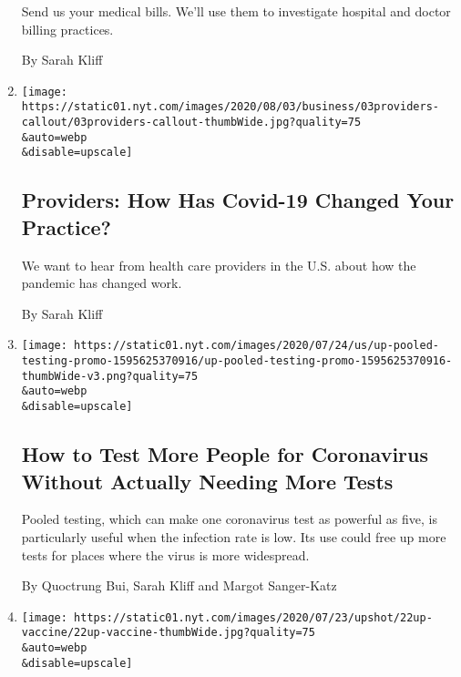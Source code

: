 \begin{enumerate}
  Send us your medical bills. We'll use them to investigate hospital and
  doctor billing practices.

  By Sarah Kliff
\item
  \href{/2020/08/03/reader-center/healthcare-workers-coronavirus-care.html}{}

  \texttt{[image: https://static01.nyt.com/images/2020/08/03/business/03providers-callout/03providers-callout-thumbWide.jpg?quality=75\\\&auto=webp\\\&disable=upscale]}

  \hypertarget{providers-how-has-covid-19-changed-your-practice}{%
  \subsection{Providers: How Has Covid-19 Changed Your
  Practice?}\label{providers-how-has-covid-19-changed-your-practice}}

  We want to hear from health care providers in the U.S. about how the
  pandemic has changed work.

  By Sarah Kliff
\item
  \href{/interactive/2020/07/27/upshot/coronavirus-pooled-testing.html}{}

  \texttt{[image: https://static01.nyt.com/images/2020/07/24/us/up-pooled-testing-promo-1595625370916/up-pooled-testing-promo-1595625370916-thumbWide-v3.png?quality=75\\\&auto=webp\\\&disable=upscale]}

  \hypertarget{how-to-test-more-people-for-coronavirus-without-actually-needing-more-tests}{%
  \subsection{How to Test More People for Coronavirus Without Actually
  Needing More
  Tests}\label{how-to-test-more-people-for-coronavirus-without-actually-needing-more-tests}}

  Pooled testing, which can make one coronavirus test as powerful as
  five, is particularly useful when the infection rate is low. Its use
  could free up more tests for places where the virus is more
  widespread.

  By Quoctrung Bui, Sarah Kliff and Margot Sanger-Katz
\item
  \href{/2020/07/22/upshot/vaccine-coronavirus-government-purchase.html}{}

  \texttt{[image: https://static01.nyt.com/images/2020/07/23/upshot/22up-vaccine/22up-vaccine-thumbWide.jpg?quality=75\\\&auto=webp\\\&disable=upscale]}


\end{enumerate}
